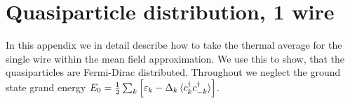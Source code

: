 
\chapter{Quasiparticle distribution, 1 wire} %

\label{Appendix.distribution.quasiparticles} %
\chead{}
In this appendix we in detail describe how to take the thermal average for the single wire within the mean field approximation. We use this to show, that the quasiparticles are Fermi-Dirac distributed. Throughout we neglect the ground state grand energy $E_0 = \frac{1}{2}\sum_k \left[\varepsilon_k - \Delta_k \braket {c^\dagger_k c^\dagger_{-k}}\right]$.

